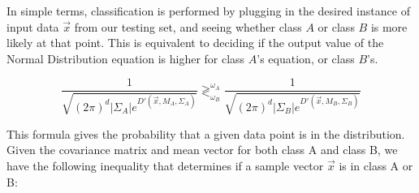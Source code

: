 \documentclass{article}
\begin{document}
In simple terms, classification is performed by plugging in the
desired instance of input data $\vec{x}$ from our testing set, and
seeing whether class $A$ or class $B$ is more likely at that
point. This is equivalent to deciding if the output value of the
Normal Distribution equation is higher for class $A$'s equation, or
class $B$'s.

\begin{displaymath}
  \dfrac{1}{\sqrt{(2\pi)^d |\Sigma_A| e^{D'(\vec{x},M_A,\Sigma_A)}}} 
  \gtrless^{\omega_A}_{\omega_B}
  \dfrac{1}{\sqrt{(2\pi)^d |\Sigma_B| e^{D'(\vec{x},M_B,\Sigma_B)}}}
\end{displaymath}

This formula gives the probability that a given data point is in the
distribution.  Given the covariance matrix and mean vector for both
class A and class B, we have the following inequality that determines
if a sample vector $\vec{x}$ is in class A or B:
\end{document}
